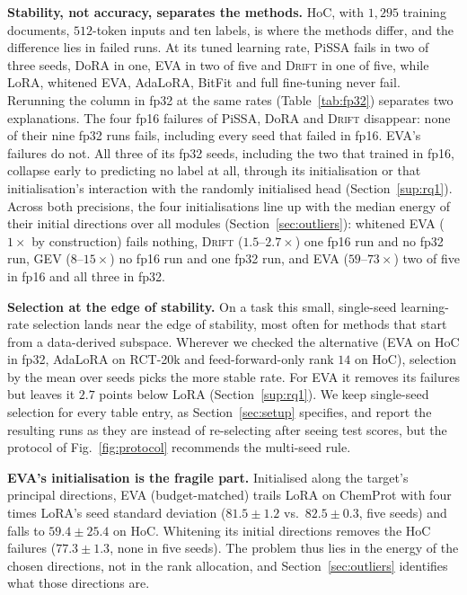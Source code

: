 \documentclass[conference]{IEEEtran}
\newcommand{\method}{\textsc{Drift}}
\begin{document}

\noindent\textbf{Stability, not accuracy, separates the methods.} HoC, with
$1{,}295$ training documents, $512$-token inputs and ten labels, is where the
methods differ, and the difference lies in failed runs. At its tuned learning
rate, PiSSA fails in two of three seeds, DoRA in one, EVA in two of five and
\method{} in one of five, while LoRA, whitened EVA, AdaLoRA, BitFit and full
fine-tuning never fail. Rerunning the column in fp32 at the same rates
(Table~\ref{tab:fp32}) separates two explanations. The four fp16 failures of
PiSSA, DoRA and \method{} disappear: none of their nine fp32 runs fails,
including every seed that failed in fp16. EVA's failures do not. All three of its
fp32 seeds, including the two that trained in fp16, collapse early to predicting
no label at all, through its initialisation or that initialisation's interaction
with the randomly initialised head (Section~\ref{sup:rq1}). Across both
precisions, the four initialisations line up with the median energy of their
initial directions over all modules (Section~\ref{sec:outliers}): whitened EVA
($1\times$ by construction) fails nothing, \method{} ($1.5$--$2.7\times$) one
fp16 run and no fp32 run, GEV ($8$--$15\times$) no fp16 run and one fp32 run,
and EVA ($59$--$73\times$) two of five in fp16 and all three in fp32.

\noindent\textbf{Selection at the edge of stability.} On a task this small,
single-seed learning-rate selection lands near the edge of stability, most often
for methods that start from a data-derived subspace. Wherever we checked the
alternative (EVA on HoC in fp32, AdaLoRA on RCT-20k and feed-forward-only rank
$14$ on HoC), selection by the mean over seeds picks the more stable rate. For
EVA it removes its failures but leaves it $2.7$ points below LoRA
(Section~\ref{sup:rq1}). We keep single-seed selection for every table entry, as
Section~\ref{sec:setup} specifies, and report the resulting runs as they are
instead of re-selecting after seeing test scores, but the protocol of
Fig.~\ref{fig:protocol} recommends the multi-seed rule.

\noindent\textbf{EVA's initialisation is the fragile part.} Initialised along
the target's principal directions, EVA (budget-matched) trails LoRA on ChemProt
with four times LoRA's seed standard deviation ($81.5\pm1.2$ vs.\ $82.5\pm0.3$,
five seeds) and falls to $59.4\pm25.4$ on HoC. Whitening its initial directions
removes the HoC failures ($77.3\pm1.3$, none in five seeds). The problem thus
lies in the energy of the chosen directions, not in the rank allocation, and
Section~\ref{sec:outliers} identifies what those directions are.
\end{document}
